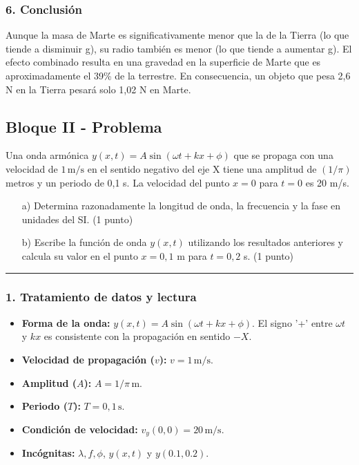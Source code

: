 \subsubsection*{6. Conclusión}
\begin{cajaconclusion}
Aunque la masa de Marte es significativamente menor que la de la Tierra (lo que tiende a disminuir g), su radio también es menor (lo que tiende a aumentar g). El efecto combinado resulta en una gravedad en la superficie de Marte que es aproximadamente el 39\% de la terrestre. En consecuencia, un objeto que pesa 2,6 N en la Tierra pesará solo 1,02 N en Marte.
\end{cajaconclusion}
\newpage

\subsection{Bloque II - Problema}
\label{subsec:B2_2017_jul_ext}

\begin{cajaenunciado}
Una onda armónica $y(x,t)=A\sin(\omega t+kx+\phi)$ que se propaga con una velocidad de $1\,\text{m/s}$ en el sentido negativo del eje X tiene una amplitud de $(1/\pi)$ metros y un periodo de 0,1 s. La velocidad del punto $x=0$ para $t=0$ es 20 m/s.
\begin{enumerate}
    \item[a)] Determina razonadamente la longitud de onda, la frecuencia y la fase en unidades del SI. (1 punto)
    \item[b)] Escribe la función de onda $y(x,t)$ utilizando los resultados anteriores y calcula su valor en el punto $x=0,1$ m para $t=0,2$ s. (1 punto)
\end{enumerate}
\end{cajaenunciado}
\hrule

\subsubsection*{1. Tratamiento de datos y lectura}
\begin{itemize}
    \item \textbf{Forma de la onda:} $y(x,t)=A\sin(\omega t+kx+\phi)$. El signo '+' entre $\omega t$ y $kx$ es consistente con la propagación en sentido $-X$.
    \item \textbf{Velocidad de propagación ($v$):} $v = 1\,\text{m/s}$.
    \item \textbf{Amplitud ($A$):} $A=1/\pi\,\text{m}$.
    \item \textbf{Periodo ($T$):} $T=0,1\,\text{s}$.
    \item \textbf{Condición de velocidad:} $v_y(0,0) = 20\,\text{m/s}$.
    \item \textbf{Incógnitas:} $\lambda, f, \phi$, $y(x,t)$ y $y(0.1, 0.2)$.
\end{itemize}

